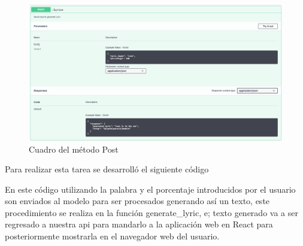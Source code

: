 \documentclass[12pt, a4paper, titlepage]{article}
\begin{document}
	\begin{figure}[H]
		\includegraphics[width=13.5cm]{./Imagenes/BackEnd/Post.png}
		\centering 
		\caption{Cuadro del método Post}
	\end{figure}
	Para realizar esta tarea se desarrolló el siguiente código
	\begin{center}
		
	\end{center}
	En este código utilizando la palabra y el porcentaje introducidos por el usuario son enviados al modelo para ser procesados generando así un texto, este procedimiento se realiza en la función generate\_lyric, e; texto generado va a ser regresado a nuestra api para mandarlo a la aplicación web en React para posteriormente mostrarla en el navegador web del usuario.
	\newpage
\end{document}
